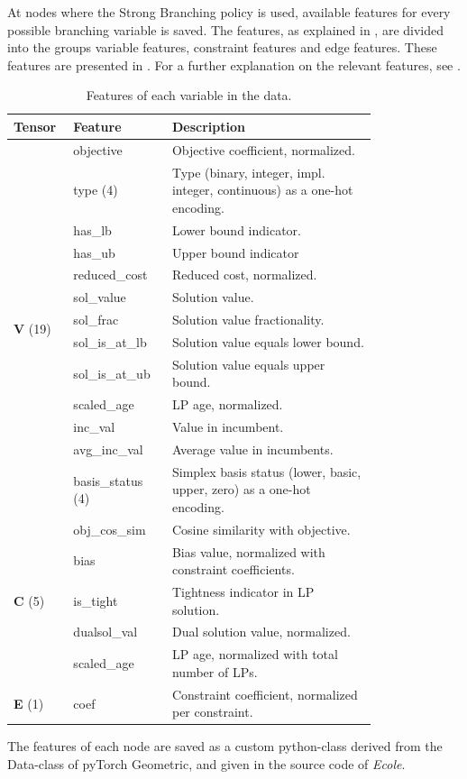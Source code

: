At nodes where the Strong Branching policy is used, available features for every possible branching variable is saved. The features, as explained in , are divided into the groups variable features, constraint features and edge features. These features are presented in 
 . For a further explanation on the relevant features, see .
%
\renewcommand{\arraystretch}{1.5}
\begin{table}[!h]
	\centering
	\begin{tabular}{p{0.1\linewidth}p{0.2\linewidth}p{0.5\linewidth}}%
		\toprule
		  \textbf{Tensor} & \textbf{Feature} & \textbf{Description} \\ 
		  \toprule
		  \multirow{13}{*}{\textbf{V} (19)} & objective & Objective coefficient, normalized.  \\
		  & type (4) & Type (binary, integer, impl. integer, continuous) as a one-hot encoding. \\
		  & has\_lb & Lower bound indicator. \\
		  & has\_ub & Upper bound indicator \\
		  & reduced\_cost & Reduced cost, normalized. \\
		  & sol\_value & Solution value. \\
          & sol\_frac  & Solution value fractionality.\\
		  & sol\_is\_at\_lb & Solution value equals lower bound.\\
		  & sol\_is\_at\_ub & Solution value equals upper bound.\\
		  & scaled\_age & LP age, normalized. \\
          & inc\_val & Value in incumbent.\\
          & avg\_inc\_val & Average value in incumbents.\\
		  & basis\_status (4) & Simplex basis status (lower, basic, upper, zero) as a one-hot encoding.\\
		  \midrule
		  \multirow{5}{*}{\textbf{C} (5)} & obj\_cos\_sim & Cosine similarity with objective. \\
		  & bias & Bias value, normalized with constraint coefficients. \\
		  & is\_tight & Tightness indicator in LP solution. \\
		  & dualsol\_val & Dual solution value, normalized. \\
		  & scaled\_age & LP age, normalized with total number of LPs. \\
		  \midrule
		  \multirow{1}{*}{\textbf{E} (1)} & coef & Constraint coefficient, normalized per constraint. \\
		\bottomrule
	\end{tabular}
	\caption{Features of each variable in the data. \cite{gasse2019exact}}\label{tab:feats}
\end{table}
%
The features of each node are saved as a custom python-class derived from the Data-class of pyTorch Geometric, and given in the source code of \textit{\gls{Ecole}}.


